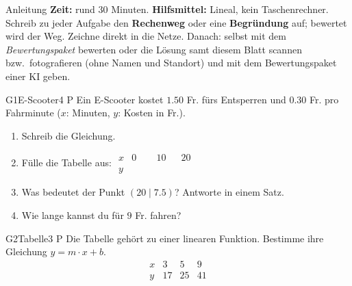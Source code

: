 \documentclass[11pt]{article}
\begin{document}

\begin{lpinfo}{Anleitung}
\textbf{Zeit:} rund 30 Minuten. \textbf{Hilfsmittel:} Lineal, kein Taschenrechner.
Schreib zu jeder Aufgabe den \textbf{Rechenweg} oder eine \textbf{Begründung} auf; bewertet wird der Weg. Zeichne direkt in die Netze.
Danach: selbst mit dem \emph{Bewertungspaket} bewerten oder die Lösung samt diesem Blatt scannen bzw.\ fotografieren
(ohne Namen und Standort) und mit dem Bewertungspaket einer KI geben.
\end{lpinfo}


\begin{lpaufgabe}{G1}{E-Scooter}{4 P}
Ein E-Scooter kostet $1.50$ Fr. fürs Entsperren und $0.30$ Fr. pro Fahrminute ($x$: Minuten, $y$: Kosten in Fr.).
\begin{enumerate}[label=(\alph*),leftmargin=*,itemsep=3pt]
\item Schreib die Gleichung.
\item Fülle die Tabelle aus: \quad $\begin{array}{c|ccc} x & 0 & 10 & 20 \\ \hline y & \phantom{00.0} & \phantom{00.0} & \phantom{00.0} \end{array}$
\item Was bedeutet der Punkt $(20 \mid 7.5)$? Antworte in einem Satz.
\item Wie lange kannst du für $9$ Fr. fahren?
\end{enumerate}
\end{lpaufgabe}

\begin{lpaufgabe}{G2}{Tabelle}{3 P}
Die Tabelle gehört zu einer linearen Funktion. Bestimme ihre Gleichung $y = m \cdot x + b$.
\[ \begin{array}{c|ccc} x & 3 & 5 & 9 \\ \hline y & 17 & 25 & 41 \end{array} \]
\end{lpaufgabe}

\end{document}
